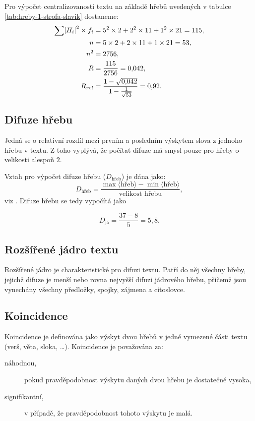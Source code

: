 \documentclass[dp.tex]{subfiles}
\begin{document}
Pro výpočet centralizovanosti textu na základě hřebů uvedených v tabulce \ref{tab:hreby-1-strofa-slavik} dostaneme:
\begin{equation}
\begin{aligned}
\sum{ \abs{H_i}^2 \times f_i} &= 5^2 \times 2 + 2^2 \times 11 + 1^2 \times 21 = 115,\\
n &=  5 \times 2 + 2 \times 11 + 1 \times 21 = 53,\\
n^2 &= 2756,\\
R &=\frac{115}{2756} = 0{,}042,\\
R_{rel} &= \frac{1-\sqrt{0{,}042}}{1-\frac{1}{\sqrt{53}}} = 0{,}92.
\end{aligned}
\end{equation}
\subsection{Difuze hřebu}
Jedná se o relativní rozdíl mezi prvním a posledním výskytem slova z jednoho hřebu v textu. Z toho vyplývá, že počítat difuze má smysl pouze pro hřeby o velikosti alespoň $2$.

Vztah pro výpočet difuze hřebu ($D_{\text{hřeb}}$) je dána jako:
\begin{equation}
D_\text{hřeb}=\frac{\max{\langle\text{hřeb}\rangle}-\min{\langle\text{hřeb}\rangle}}{\text{velikost hřebu}},
\end{equation}
viz \cite[str. 304]{Wimmer2003}. Difuze hřebu  se tedy vypočítá jako

\begin{equation}
D_\text{já}=\frac{37 - 8}{5} = 5{,}8.
\end{equation}\textbf{}


\subsection{Rozšířené jádro textu}
Rozšířené jádro je charakteristické pro difuzi textu. Patří do něj všechny hřeby, jejichž difuze je menší nebo rovna nejvyšší difuzi jádrového hřebu, přičemž jsou vynechány všechny předložky, spojky, zájmena a citoslovce.

\subsection{Koincidence}
Koincidence je definována jako výskyt dvou hřebů v jedné vymezené části textu (verš, věta, sloka, \ldots). Koincidence je považována za:
\begin{description}
\item[náhodnou,] pokud pravděpodobnost výskytu daných dvou hřebu je dostatečně vysoka,
\item[signifikantní,] v případě, že pravděpodobnost tohoto výskytu je malá.
\end{description}
\end{document}

